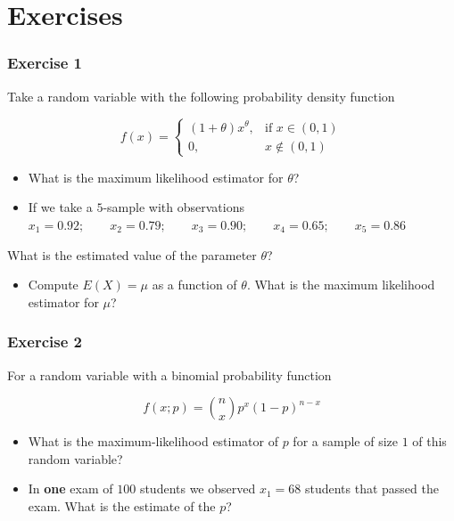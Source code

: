 \documentclass[
]{book}
\providecommand{\tightlist}{%
  \setlength{\itemsep}{0pt}\setlength{\parskip}{0pt}}
\begin{document}
\hypertarget{exercises-10}{%
\section{Exercises}\label{exercises-10}}

\hypertarget{exercise-1-9}{%
\subsubsection{Exercise 1}\label{exercise-1-9}}

Take a random variable with the following probability density function

\[
f(x)=
\begin{cases}
    (1+\theta)x^\theta,& \text{if } x\in (0,1)\\
    0,&  x\notin (0,1)
\end{cases}
\]

\begin{itemize}
\item
  What is the maximum likelihood estimator for \(\theta\)?
\item
  If we take a \(5\)-sample with observations
  \(x_1 = 0.92; \qquad x_2 = 0.79; \qquad x_3 = 0.90; \qquad x_4 = 0.65; \qquad x_5 = 0.86\)
\end{itemize}

What is the estimated value of the parameter \(\theta\)?

\begin{itemize}
\tightlist
\item
  Compute \(E(X)=\mu\) as a function of \(\theta\). What is the maximum likelihood estimator for \(\mu\)?
\end{itemize}

\hypertarget{exercise-2-9}{%
\subsubsection{Exercise 2}\label{exercise-2-9}}

For a random variable with a binomial probability function

\[f(x; p)=\binom n x p^x(1-p)^{n-x}\]

\begin{itemize}
\item
  What is the maximum-likelihood estimator of \(p\) for a sample of size \(1\) of this random variable?
\item
  In \textbf{one} exam of \(100\) students we observed \(x_1=68\) students that passed the exam. What is the estimate of the \(p\)?
\end{itemize}
\end{document}
